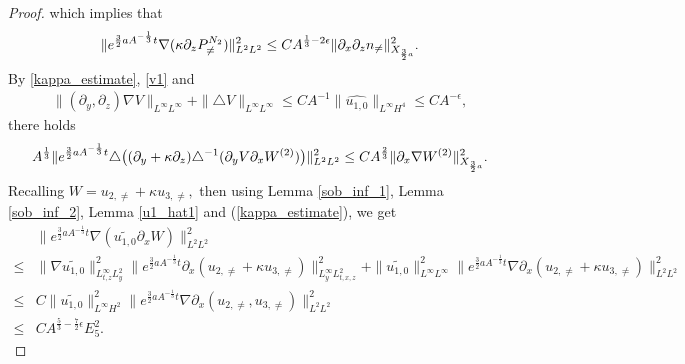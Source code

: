 \documentclass[12pt, reqno]{amsart}
\numberwithin{equation}{section}
\begin{document}
\begin{proof}
		which implies that 
		\begin{equation}\label{w1_equ3}
			\|{\rm e}^{\frac32aA^{-\frac{1}{3}}t} \nabla(\kappa\partial_zP^{N_2}_{\neq})\|^2_{L^2L^2}\leq 
			CA^{\frac13-2\epsilon}\|\partial_x\partial_zn_{\neq}\|^2_{X_{\frac32a}} .
		\end{equation}	
		By \eqref{kappa_estimate}, \eqref{v1} and 
		\begin{equation}\label{v3}
			\begin{aligned}
				\|(\partial_y,\partial_z)\nabla V\|_{L^{\infty}L^{\infty}}+
				\|\triangle V\|_{L^{\infty}L^{\infty}}
				\leq CA^{-1}\|\widehat{u_{1,0}}\|_{L^{\infty}H^4}
				\leq CA^{-\epsilon},
			\end{aligned}
		\end{equation}
		there holds
		\begin{equation}\label{result_temp1}
			A^{\frac13}\|{\rm e}^{\frac32aA^{-\frac{1}{3}}t} 
			\triangle\big((\partial_y+\kappa\partial_z)\triangle^{-1}
			(\partial_yV\partial_xW^{(2)})\big)\|^2_{L^2L^2}
			\leq CA^{\frac23}\|\partial_x\nabla W^{(2)}\|_{X_{\frac32a}}^2.
		\end{equation}
		Recalling $ W=u_{2,\neq}+\kappa u_{3,\neq}, $ then using Lemma \ref{sob_inf_1}, Lemma \ref{sob_inf_2}, Lemma \ref{u1_hat1} and (\ref{kappa_estimate}), we get
		\begin{equation}\label{widetilde u10}
			\begin{aligned}
				&\|e^{\frac32aA^{-\frac13}t}\nabla(\widetilde{ u_{1,0}}\partial_{x}W)\|_{L^{2}L^{2}}^{2}\\
				\leq&\|\nabla\widetilde{ u_{1,0}}\|_{L^{\infty}_{t,z}L^{2}_{y}}^{2}\|e^{\frac32aA^{-\frac13}t}\partial_{x}(u_{2,\neq}+\kappa u_{3,\neq})\|_{L^{\infty}_{y}L^{2}_{t,x,z}}^{2}+\|\widetilde{ u_{1,0}}\|_{L^{\infty}L^{\infty}}^{2}\|e^{\frac32aA^{-\frac13}t}\nabla\partial_{x}(u_{2,\neq}+\kappa u_{3,\neq})\|_{L^{2}L^{2}}^{2}\\\leq&C\|\widetilde{ u_{1,0}}\|_{L^{\infty}H^{2}}^{2}\|e^{\frac32aA^{-\frac13}t}\nabla\partial_{x}(u_{2,\neq}, u_{3,\neq})\|_{L^{2}L^{2}}^{2}\\\leq&CA^{\frac53-\frac72\epsilon}E_{5}^{2}.
			\end{aligned}
		\end{equation}
		

\end{proof}
\end{document}
